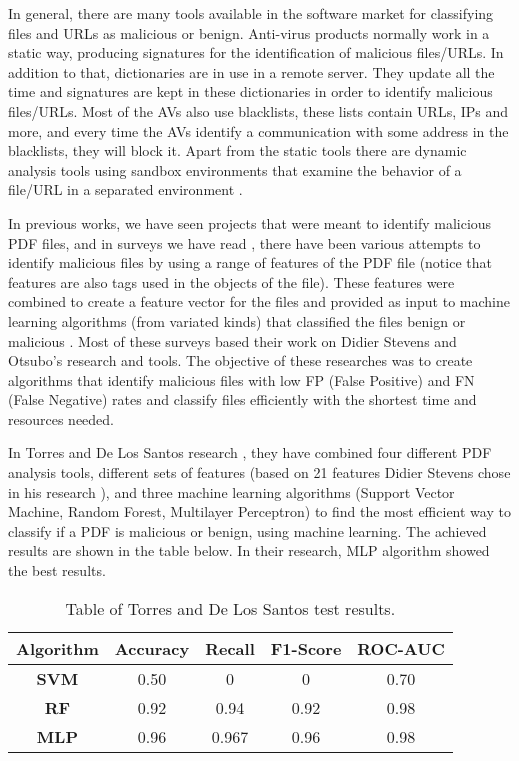 \documentclass{article}
\begin{document}
\indent In general, there are many tools available in the software market for classifying files and URLs as malicious or benign. Anti-virus products normally work in a static way, producing signatures for the identification of malicious files/URLs. In addition to that, dictionaries are in use in a remote server. They update all the time and signatures are kept in these dictionaries in order to identify malicious files/URLs. Most of the AVs also use blacklists, these lists contain URLs, IPs and more, and every time the AVs identify a communication with some address in the blacklists, they will block it. Apart from the static tools there are dynamic analysis tools using sandbox environments that examine the behavior of a file/URL in a separated environment \cite{patil2018malicious}. 

\indent In previous works, we have seen projects that were meant to identify malicious PDF files, and in surveys we have read \cite{BGU2014survey} \cite{Baldoni2018survey}, there have been various attempts to identify malicious files by using a range of features of the PDF file (notice that features are also tags used in the objects of the file). These features were combined to create a feature vector for the files and provided as input to machine learning algorithms (from variated kinds) that classified the files benign or malicious \cite{torres2018malicious} \cite{Bonan2018ML}. Most of these surveys based their work on Didier Stevens \cite{1}  and Otsubo's \cite{OtsuboChecker} research and tools. The objective of these researches was to create algorithms that identify malicious files with low FP (False Positive) and FN (False Negative) rates and classify files efficiently with the shortest time and resources needed.

\indent In Torres and De Los Santos research \cite{torres2018malicious}, they have combined four different PDF analysis tools, different sets of features (based on 21 features Didier Stevens chose in his research \cite{1}), and three machine learning algorithms (Support Vector Machine, Random Forest, Multilayer Perceptron) to find the most efficient way to classify if a PDF is malicious or benign, using machine learning. The achieved results are shown in the table below. In their research, MLP algorithm showed the best results.

\begin{table}[htb]
\centering
\begin{tabular}[c]{|c|c|c|c|c|}
\hline
\textbf{Algorithm} & \textbf{Accuracy} & \textbf{Recall} & \textbf{F1-Score} & \textbf{ROC-AUC}\\
\hline
\textbf{SVM} & 0.50 & 0 & 0 & 0.70\\
\hline
\textbf{RF} & 0.92 & 0.94 & 0.92 & 0.98\\
\hline
\textbf{MLP} & 0.96 & 0.967 & 0.96 & 0.98\\
\hline
\end{tabular}
\caption{Table of Torres and De Los Santos \cite{torres2018malicious} test results.}
\end{table}
\end{document}
